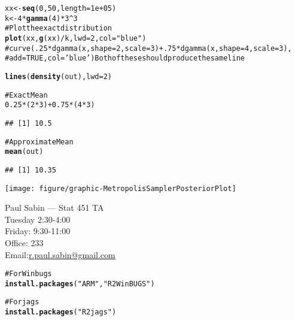 \documentclass[12pt,letterpaper,oneside]{article}\usepackage{graphicx, color}
\makeatletter
\newcommand{\hlfunctioncall}[1]{\textcolor[rgb]{0.501960784313725,0,0.329411764705882}{\textbf{#1}}}%
\newcommand{\hlstring}[1]{\textcolor[rgb]{0.6,0.6,1}{#1}}%
\newcommand{\hlcomment}[1]{\textcolor[rgb]{0.180392156862745,0.6,0.341176470588235}{#1}}%
\newenvironment{kframe}{%
 \def\at@end@of@kframe{}%
 \ifinner\ifhmode%
  \def\at@end@of@kframe{\end{minipage}}%
  \begin{minipage}{\columnwidth}%
 \fi\fi%
 \def\FrameCommand##1{\hskip\@totalleftmargin \hskip-\fboxsep
 \colorbox{shadecolor}{##1}\hskip-\fboxsep
     \hskip-\linewidth \hskip-\@totalleftmargin \hskip\columnwidth}%
 \MakeFramed {\advance\hsize-\width
   \@totalleftmargin\z@ \linewidth\hsize
   \@setminipage}}%
 {\par\unskip\endMakeFramed%
 \at@end@of@kframe}
\newenvironment{knitrout}{}{} %
\newcommand{\dateTaken}{January 7, 2013}
\makeatother
\begin{document}
\begin{knitrout}\scriptsize
{}\color{fgcolor}\begin{kframe}
\begin{alltt}
xx <- \hlfunctioncall{seq}(0, 50, length = 1e+05)
k <- 4 * \hlfunctioncall{gamma}(4) * 3^3
\hlcomment{# Plot the exact distribution}
\hlfunctioncall{plot}(xx, \hlfunctioncall{g}(xx)/k, lwd = 2, col = \hlstring{"blue"})
\hlcomment{# curve(.25*dgamma(x, shape=2, scale=3)+.75*dgamma(x, shape=4, scale=3),}
\hlcomment{# add=TRUE, col='blue') Both of these should produce the same line}

\hlfunctioncall{lines}(\hlfunctioncall{density}(out), lwd = 2)

\hlcomment{# Exact Mean}
0.25 * (2 * 3) + 0.75 * (4 * 3)
\end{alltt}
\begin{verbatim}
## [1] 10.5
\end{verbatim}
\begin{alltt}

\hlcomment{# Approximate Mean}
\hlfunctioncall{mean}(out)
\end{alltt}
\begin{verbatim}
## [1] 10.35
\end{verbatim}
\end{kframe}

{\centering \texttt{[image: figure/graphic-MetropolisSamplerPosteriorPlot]} 

}



\end{knitrout}

\renewcommand{\dateTaken}{January 10, 2013}
\daysep

Paul Sabin --- Stat 451 TA\\
Tuesday 2:30-4:00\\
Friday: 9:30-11:00\\
Office: 233\\
Email:\href{mailto:r.paul.sabin@gmail.com}{r.paul.sabin@gmail.com}

\begin{knitrout}\scriptsize
{}\color{fgcolor}\begin{kframe}
\begin{alltt}
\hlcomment{# For Winbugs}
\hlfunctioncall{install.packages}(\hlstring{"ARM"}, \hlstring{"R2WinBUGS"})

\hlcomment{# For jags}
\hlfunctioncall{install.packages}(\hlstring{"R2jags"})
\end{alltt}
\end{kframe}
\end{knitrout}
\end{document}
